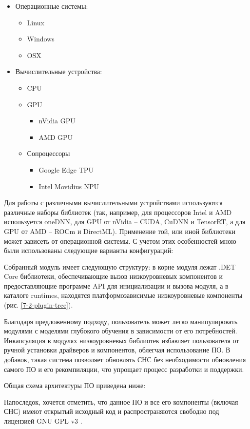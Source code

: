 \begin{itemize}
    \item Операционные системы:
    \begin{itemize}
        \item Linux
        \item Windows
        \item OSX
    \end{itemize}
    \item Вычислительные устройства:
    \begin{itemize}
        \item CPU
        \item GPU
        \begin{itemize}
            \item nVidia GPU
            \item AMD GPU
        \end{itemize}
        \item Сопроцессоры
        \begin{itemize}
            \item Google Edge TPU
            \item Intel Movidius NPU
        \end{itemize}
    \end{itemize}
\end{itemize}

Для работы с различными вычислительными устройствами используются различные наборы библиотек (так, например, для процессоров Intel и AMD используется oneDNN, для GPU от nVidia -- CUDA, CuDNN и TensorRT, а для GPU от AMD -- ROCm и DirectML). Применение той, или иной библиотеки может зависеть от операционной системы. С учетом этих особенностей мною были использованы следующие варианты конфигураций:


Собранный модуль имеет следующую структуру: в корне модуля лежат .DET Core библиотеки, обеспечивающие вызов низкоуровневых компонентов и предоставляющие программе API для инициализации и вызова модуля, а в каталоге runtimes, находятся платформозависимые низкоуровневые компоненты (рис. \ref{7-2-plugin-tree}).


Благодаря предложенному подходу, пользователь может легко манипулировать модулями с моделями глубокого обучения в зависимости от его потребностей. Инкапсуляция в модулях низкоуровневых библиотек избавляет пользователя от ручной установки драйверов и компонентов, облегчая использование ПО. В добавок, такая система позволяет обновлять СНС без необходимости обновления самого ПО и его рекомпиляции, что упрощает процесс разработки и поддержки.

Общая схема архитектуры ПО приведена ниже:


Напоследок, хочется отметить, что данное ПО и все его компоненты (включая СНС) имеют открытый исходный код и распространяются свободно под лицензией GNU GPL v3 \cite{lib-lacmus} \cite{lib-lacmus-app}.
